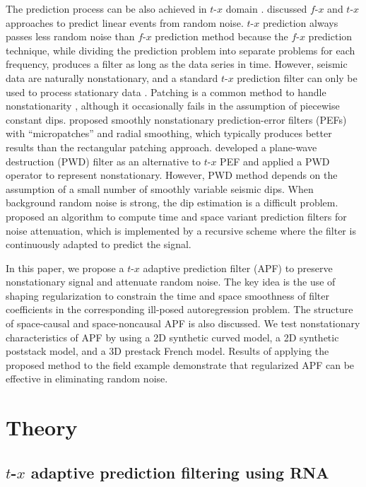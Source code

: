 The prediction process can be also achieved in $t$-$x$ domain
\cite[]{Claerbout92}. \cite{Abma95} discussed $f$-$x$ and $t$-$x$
approaches to predict linear events from random noise. $t$-$x$
prediction always passes less random noise than $f$-$x$ prediction
method because the $f$-$x$ prediction technique, while dividing the
prediction problem into separate problems for each frequency, produces
a filter as long as the data series in time. However, seismic data are
naturally nonstationary, and a standard $t$-$x$ prediction filter can
only be used to process stationary data \cite[]{Claerbout92}. Patching
is a common method to handle nonstationarity \cite[]{Claerbout10},
although it occasionally fails in the assumption of piecewise constant
dips. \cite{Crawley99} proposed smoothly nonstationary
prediction-error filters (PEFs) with ``micropatches'' and radial
smoothing, which typically produces better results than the
rectangular patching approach. \cite{GEO67-06-19461960} developed a
plane-wave destruction (PWD) filter \cite[]{Claerbout92} as an
alternative to $t$-$x$ PEF and applied a PWD operator to represent
nonstationary. However, PWD method depends on the assumption of a
small number of smoothly variable seismic dips. When background random
noise is strong, the dip estimation is a difficult
problem. \cite{Sacchi09} proposed an algorithm to compute time and
space variant prediction filters for noise attenuation, which is
implemented by a recursive scheme where the filter is continuously
adapted to predict the signal.

In this paper, we propose a $t$-$x$ adaptive prediction filter (APF)
to preserve nonstationary signal and attenuate random noise. The key
idea is the use of shaping regularization \cite[]{Fomel07} to
constrain the time and space smoothness of filter coefficients in the
corresponding ill-posed autoregression problem. The structure of
space-causal and space-noncausal APF is also discussed. We test
nonstationary characteristics of APF by using a 2D synthetic curved
model, a 2D synthetic poststack model, and a 3D prestack French
model. Results of applying the proposed method to the field example
demonstrate that regularized APF can be effective in eliminating
random noise.

\section{Theory}

\subsection{$t$-$x$ adaptive prediction filtering using RNA}

